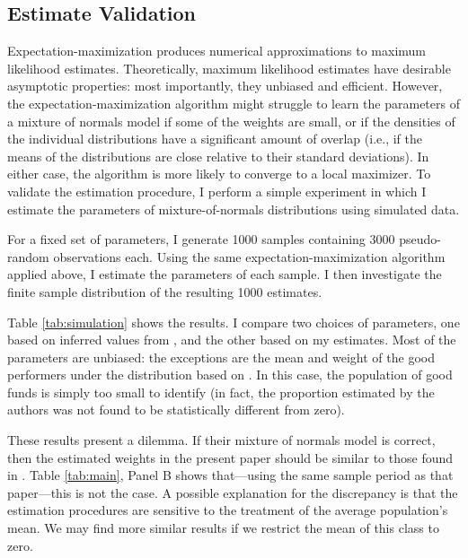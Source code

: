 	\subsection{Estimate Validation}
		Expectation-maximization produces numerical approximations to maximum likelihood estimates. Theoretically, maximum likelihood estimates have desirable asymptotic properties: most importantly, they unbiased and efficient.  However, the expectation-maximization algorithm might struggle to learn the parameters of a mixture of normals model if some of the weights are small, or if the densities of the individual distributions have a significant amount of overlap (i.e., if the means of the distributions are close relative to their standard deviations). In either case, the algorithm is more likely to converge to a local maximizer. To validate the estimation procedure, I perform a simple experiment in which I estimate the parameters of mixture-of-normals distributions using simulated data.

		For a fixed set of parameters, I generate 1000 samples containing 3000 pseudo-random observations each. Using the same expectation-maximization algorithm applied above, I estimate the parameters of each sample. I then investigate the finite sample distribution of the resulting 1000 estimates.

		Table \ref{tab:simulation} shows the results. I compare two choices of parameters, one based on inferred values from \citet{Barras2010}, and the other based on my estimates. Most of the parameters are unbiased: the exceptions are the mean and weight of the good performers under the distribution based on \citet{Barras2010}.  In this case, the population of good funds is simply too small to identify (in fact, the proportion estimated by the authors was not found to be statistically different from zero).

		These results present a dilemma. If their mixture of normals model is correct, then the estimated weights in the present paper should be similar to those found in \citet{Barras2010}. Table \ref{tab:main}, Panel B shows that---using the same sample period as that paper---this is not the case.  A possible explanation for the discrepancy is that the estimation procedures are sensitive to the treatment of the average population's mean.  We may find more similar results if we restrict the mean of this class to zero.

